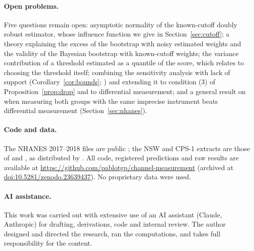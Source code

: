 \paragraph{Open problems.} Five questions remain open: asymptotic normality of the known-cutoff doubly robust estimator, whose influence function we give in Section~\ref{sec:cutoff}; a theory explaining the excess of the bootstrap with noisy estimated weights and the validity of the Bayesian bootstrap with known-cutoff weights; the variance contribution of a threshold estimated as a quantile of the score, which relates to choosing the threshold itself; combining the sensitivity analysis with lack of support (Corollary~\ref{cor:bounds}; \citealp{manamkoong2025}) and extending it to condition (3) of Proposition~\ref{prop:drop} and to differential measurement; and a general result on when measuring both groups with the same imprecise instrument beats differential measurement (Section~\ref{sec:nhanes}).

\paragraph{Code and data.} The NHANES 2017--2018 files are public \citep{nchs2020}; the NSW and CPS-1 extracts are those of \citet{dehejia1999} and \citet{lalonde1986}, as distributed by \citet{cunningham2021}. All code, registered predictions and raw results are available at \url{https://github.com/pablotgp/channel-measurement} (archived at \href{https://doi.org/10.5281/zenodo.23639437}{doi:10.5281/zenodo.23639437}). No proprietary data were used.

\paragraph{AI assistance.} This work was carried out with extensive use of an AI assistant (Claude, Anthropic) for drafting, derivations, code and internal review. The author designed and directed the research, ran the computations, and takes full responsibility for the content.
